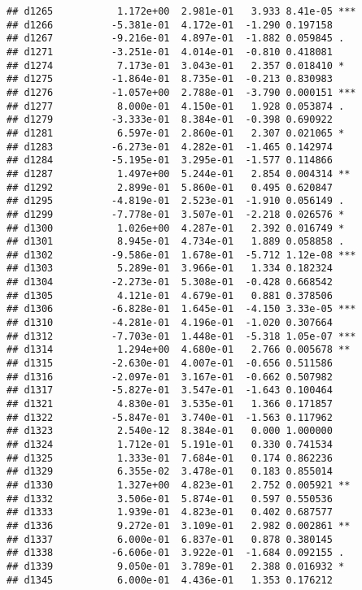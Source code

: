 \documentclass[
]{article}
\begin{document}
\begin{verbatim}
## d1265           1.172e+00  2.981e-01   3.933 8.41e-05 ***
## d1266          -5.381e-01  4.172e-01  -1.290 0.197158    
## d1267          -9.216e-01  4.897e-01  -1.882 0.059845 .  
## d1271          -3.251e-01  4.014e-01  -0.810 0.418081    
## d1274           7.173e-01  3.043e-01   2.357 0.018410 *  
## d1275          -1.864e-01  8.735e-01  -0.213 0.830983    
## d1276          -1.057e+00  2.788e-01  -3.790 0.000151 ***
## d1277           8.000e-01  4.150e-01   1.928 0.053874 .  
## d1279          -3.333e-01  8.384e-01  -0.398 0.690922    
## d1281           6.597e-01  2.860e-01   2.307 0.021065 *  
## d1283          -6.273e-01  4.282e-01  -1.465 0.142974    
## d1284          -5.195e-01  3.295e-01  -1.577 0.114866    
## d1287           1.497e+00  5.244e-01   2.854 0.004314 ** 
## d1292           2.899e-01  5.860e-01   0.495 0.620847    
## d1295          -4.819e-01  2.523e-01  -1.910 0.056149 .  
## d1299          -7.778e-01  3.507e-01  -2.218 0.026576 *  
## d1300           1.026e+00  4.287e-01   2.392 0.016749 *  
## d1301           8.945e-01  4.734e-01   1.889 0.058858 .  
## d1302          -9.586e-01  1.678e-01  -5.712 1.12e-08 ***
## d1303           5.289e-01  3.966e-01   1.334 0.182324    
## d1304          -2.273e-01  5.308e-01  -0.428 0.668542    
## d1305           4.121e-01  4.679e-01   0.881 0.378506    
## d1306          -6.828e-01  1.645e-01  -4.150 3.33e-05 ***
## d1310          -4.281e-01  4.196e-01  -1.020 0.307664    
## d1312          -7.703e-01  1.448e-01  -5.318 1.05e-07 ***
## d1314           1.294e+00  4.680e-01   2.766 0.005678 ** 
## d1315          -2.630e-01  4.007e-01  -0.656 0.511586    
## d1316          -2.097e-01  3.167e-01  -0.662 0.507982    
## d1317          -5.827e-01  3.547e-01  -1.643 0.100464    
## d1321           4.830e-01  3.535e-01   1.366 0.171857    
## d1322          -5.847e-01  3.740e-01  -1.563 0.117962    
## d1323           2.540e-12  8.384e-01   0.000 1.000000    
## d1324           1.712e-01  5.191e-01   0.330 0.741534    
## d1325           1.333e-01  7.684e-01   0.174 0.862236    
## d1329           6.355e-02  3.478e-01   0.183 0.855014    
## d1330           1.327e+00  4.823e-01   2.752 0.005921 ** 
## d1332           3.506e-01  5.874e-01   0.597 0.550536    
## d1333           1.939e-01  4.823e-01   0.402 0.687577    
## d1336           9.272e-01  3.109e-01   2.982 0.002861 ** 
## d1337           6.000e-01  6.837e-01   0.878 0.380145    
## d1338          -6.606e-01  3.922e-01  -1.684 0.092155 .  
## d1339           9.050e-01  3.789e-01   2.388 0.016932 *  
## d1345           6.000e-01  4.436e-01   1.353 0.176212    

\end{verbatim}
\end{document}
